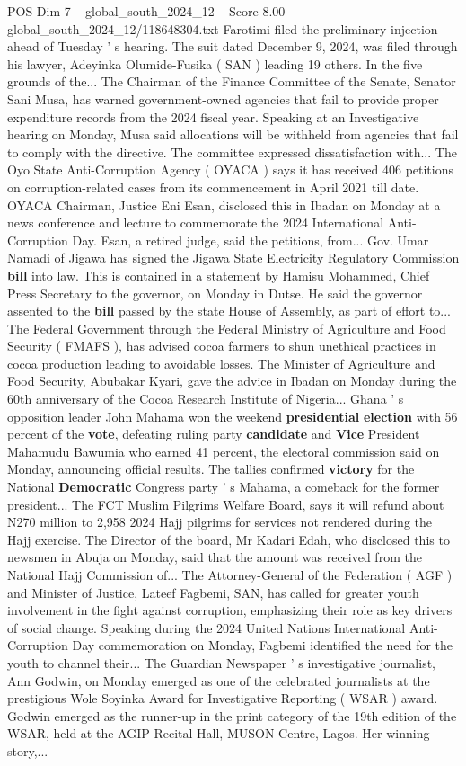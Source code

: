 \begin{textsample}{POS Dim 7 – global\_south\_2024\_12 – Score 8.00 – global\_south\_2024\_12/118648304.txt}
Farotimi filed the preliminary injection ahead of Tuesday ' s hearing.
The suit dated December 9, 2024, was filed through his lawyer, Adeyinka Olumide-Fusika ( SAN ) leading 19 others.
In the five grounds of the...
The Chairman of the Finance Committee of the Senate, Senator Sani Musa, has warned government-owned agencies that fail to provide proper expenditure records from the 2024 fiscal year.
Speaking at an Investigative hearing on Monday, Musa said allocations will be withheld from agencies that fail to comply with the directive.
The committee expressed dissatisfaction with...
The Oyo State Anti-Corruption Agency ( OYACA ) says it has received 406 petitions on corruption-related cases from its commencement in April 2021 till date.
OYACA Chairman, Justice Eni Esan, disclosed this in Ibadan on Monday at a news conference and lecture to commemorate the 2024 International Anti-Corruption Day.
Esan, a retired judge, said the petitions, from...
Gov.
Umar Namadi of Jigawa has signed the Jigawa State Electricity Regulatory Commission \textbf{bill} into law.
This is contained in a statement by Hamisu Mohammed, Chief Press Secretary to the governor, on Monday in Dutse.
He said the governor assented to the \textbf{bill} passed by the state House of Assembly, as part of effort to...
The Federal Government through the Federal Ministry of Agriculture and Food Security ( FMAFS ), has advised cocoa farmers to shun unethical practices in cocoa production leading to avoidable losses.
The Minister of Agriculture and Food Security, Abubakar Kyari, gave the advice in Ibadan on Monday during the 60th anniversary of the Cocoa Research Institute of Nigeria...
Ghana ' s opposition leader John Mahama won the weekend \textbf{presidential} \textbf{election} with 56 percent of the \textbf{vote}, defeating ruling party \textbf{candidate} and \textbf{Vice} President Mahamudu Bawumia who earned 41 percent, the electoral commission said on Monday, announcing official results.
The tallies confirmed \textbf{victory} for the National \textbf{Democratic} Congress party ' s Mahama, a comeback for the former president...
The FCT Muslim Pilgrims Welfare Board, says it will refund about N270 million to 2,958 2024 Hajj pilgrims for services not rendered during the Hajj exercise.
The Director of the board, Mr Kadari Edah, who disclosed this to newsmen in Abuja on Monday, said that the amount was received from the National Hajj Commission of...
The Attorney-General of the Federation ( AGF ) and Minister of Justice, Lateef Fagbemi, SAN, has called for greater youth involvement in the fight against corruption, emphasizing their role as key drivers of social change.
Speaking during the 2024 United Nations International Anti-Corruption Day commemoration on Monday, Fagbemi identified the need for the youth to channel their...
The Guardian Newspaper ' s investigative journalist, Ann Godwin, on Monday emerged as one of the celebrated journalists at the prestigious Wole Soyinka Award for Investigative Reporting ( WSAR ) award.
Godwin emerged as the runner-up in the print category of the 19th edition of the WSAR, held at the AGIP Recital Hall, MUSON Centre, Lagos.
Her winning story,...


\end{textsample}
